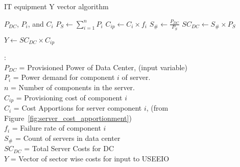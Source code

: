   \begin{algorithm}
    \caption{IT equipment Y vector algorithm}
    \begin{algorithmic}
      \REQUIRE $P_{DC}$, $P_{i}$, and $C_i$
      \STATE $P_{S} \gets \sum\limits_{i=1}^n P_{i}$
      \STATE $C_{ip} \gets C_i \times f_i$
      \STATE $S_\# \gets \frac{P_{DC}}{P_{S}}$
      \STATE $SC_{DC} \gets S_\# \times P_{S}$
      
      \vspace{.1in}
      \RETURN $Y \gets SC_{DC} \times C_{ip}$
      
      \vspace{.1in}
      : \\
        \hspace{.2in}$P_{DC}$ = Provisioned Power of Data Center, (input variable) \\
        \hspace{.2in}$P_{i}$ = Power demand for component $i$ of server.  \\
        \hspace{.2in}$n$ = Number of components in the server.  \\
        \hspace{.2in}$C_{ip}$ = Provisioning cost of component $i$ \\
        \hspace{.2in}$C_i$ = Cost Apportions for server component $i$, (from Figure~\ref{fig:server_cost_apportionment}) \\
        \hspace{.2in}$f_i$ = Failure rate of component $i$\\
        \hspace{.2in}$S_\#$ = Count of servers in data center \\
        \hspace{.2in}$SC_{DC}$ = Total Server Costs for DC \\
        \hspace{.2in}$Y$ = Vector of sector wise costs for input to USEEIO
    
    \end{algorithmic}
    \label{it_y_vector_algo}
  \end{algorithm}